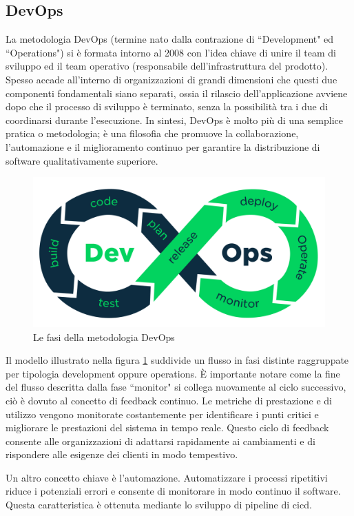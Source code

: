 \subsection{DevOps}
La metodologia DevOps (termine nato dalla contrazione di ``Development" ed ``Operations") si è formata intorno al 2008 con l'idea chiave di unire il team di sviluppo ed il team operativo (responsabile dell'infrastruttura del prodotto). Spesso accade all'interno di organizzazioni di grandi dimensioni che questi due componenti fondamentali siano separati, ossia il rilascio dell'applicazione avviene dopo che il processo di sviluppo è terminato, senza la possibilità tra i due di coordinarsi durante l'esecuzione. In sintesi, DevOps è molto più di una semplice pratica o metodologia; è una filosofia che promuove la collaborazione, l'automazione e il miglioramento continuo per garantire la distribuzione di software qualitativamente superiore.  
\begin{figure}[htb]
	\centering
	\includegraphics[width=.9\linewidth]{figures/devops-process.png}
	\caption{Le fasi della metodologia DevOps}
	\label{fig:devops-process}
\end{figure}
Il modello illustrato nella figura \ref{fig:devops-process} suddivide un flusso in fasi distinte raggruppate per tipologia development oppure operations. È importante notare come la fine del flusso descritta dalla fase ``monitor" si collega nuovamente al ciclo successivo, ciò è dovuto al concetto di feedback continuo. Le metriche di prestazione e di utilizzo vengono monitorate costantemente per identificare i punti critici e migliorare le prestazioni del sistema in tempo reale. Questo ciclo di feedback consente alle organizzazioni di adattarsi rapidamente ai cambiamenti e di rispondere alle esigenze dei clienti in modo tempestivo.

Un altro concetto chiave è l'automazione. Automatizzare i processi ripetitivi riduce i potenziali errori e consente di monitorare in modo continuo il software. Questa caratteristica è ottenuta mediante lo sviluppo di pipeline di \ac{cicd}.

